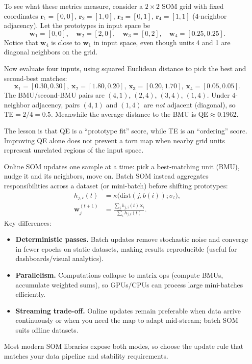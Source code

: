 \begin{tcolorbox}[summarybox, title={Tiny numeric check: QE vs.\ TE (they can disagree)}]
To see what these metrics measure, consider a \(2\times 2\) SOM grid with fixed coordinates
\(\mathbf{r}_1=[0,0]\), \(\mathbf{r}_2=[1,0]\), \(\mathbf{r}_3=[0,1]\), \(\mathbf{r}_4=[1,1]\) (4-neighbor adjacency). Let the prototypes in input space be
\[
\mathbf{w}_1=[0,0],\quad \mathbf{w}_2=[2,0],\quad \mathbf{w}_3=[0,2],\quad \mathbf{w}_4=[0.25,0.25].
\]
Notice that \(\mathbf{w}_4\) is close to \(\mathbf{w}_1\) in input space, even though units 4 and 1 are diagonal neighbors on the grid.

Now evaluate four inputs, using squared Euclidean distance to pick the best and second-best matches:
\[
\mathbf{x}_1=[0.30,0.30],\ \mathbf{x}_2=[1.80,0.20],\ \mathbf{x}_3=[0.20,1.70],\ \mathbf{x}_4=[0.05,0.05].
\]
The BMU/second-BMU pairs are \((4,1)\), \((2,4)\), \((3,4)\), \((1,4)\). Under 4-neighbor adjacency, pairs \((4,1)\) and \((1,4)\) are \emph{not} adjacent (diagonal), so \(\text{TE}=2/4=0.5\).
Meanwhile the average distance to the BMU is \(\text{QE}\approx 0.1962\).

The lesson is that QE is a ``prototype fit'' score, while TE is an ``ordering'' score. Improving QE alone does not prevent a torn map when nearby grid units represent unrelated regions of the input space.
\end{tcolorbox}

\begin{tcolorbox}[summarybox, title={Batch SOM in practice}, breakable]
Online SOM updates one sample at a time: pick a best-matching unit (BMU), nudge it and its neighbors, move on. Batch SOM instead aggregates responsibilities across a dataset (or mini\hyp{}batch) before shifting prototypes:
\begin{align*}
h_{j, i}(t) &= \kappa\big(\text{dist}(j, b(i)); \sigma_t\big),\\
\mathbf{w}_j^{(t+1)} &= \frac{\sum_i h_{j, i}(t)\,\mathbf{x}_i}{\sum_i h_{j, i}(t)}.
\end{align*}
Key differences:
\begin{itemize}
    \item \textbf{Deterministic passes.} Batch updates remove stochastic noise and converge in fewer epochs on static datasets, making results reproducible (useful for dashboards/visual analytics).
    \item \textbf{Parallelism.} Computations collapse to matrix ops (compute BMUs, accumulate weighted sums), so GPUs/CPUs can process large mini\hyp{}batches efficiently.
    \item \textbf{Streaming trade-off.} Online updates remain preferable when data arrive continuously or when you need the map to adapt mid-stream; batch SOM suits offline datasets.
\end{itemize}
Most modern SOM libraries expose both modes, so choose the update rule that matches your data pipeline and stability requirements.
\end{tcolorbox}

